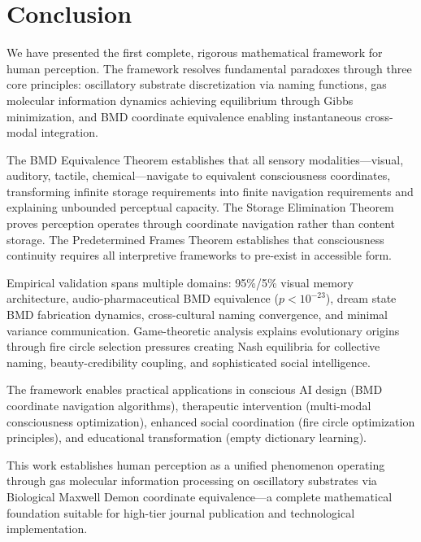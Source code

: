\documentclass[12pt]{article}
\theoremstyle{definition}
\theoremstyle{remark}
\begin{document}
\section{Conclusion}

We have presented the first complete, rigorous mathematical framework for human perception. The framework resolves fundamental paradoxes through three core principles: oscillatory substrate discretization via naming functions, gas molecular information dynamics achieving equilibrium through Gibbs minimization, and BMD coordinate equivalence enabling instantaneous cross-modal integration.

The BMD Equivalence Theorem establishes that all sensory modalities—visual, auditory, tactile, chemical—navigate to equivalent consciousness coordinates, transforming infinite storage requirements into finite navigation requirements and explaining unbounded perceptual capacity. The Storage Elimination Theorem proves perception operates through coordinate navigation rather than content storage. The Predetermined Frames Theorem establishes that consciousness continuity requires all interpretive frameworks to pre-exist in accessible form.

Empirical validation spans multiple domains: 95\%/5\% visual memory architecture, audio-pharmaceutical BMD equivalence ($p < 10^{-23}$), dream state BMD fabrication dynamics, cross-cultural naming convergence, and minimal variance communication. Game-theoretic analysis explains evolutionary origins through fire circle selection pressures creating Nash equilibria for collective naming, beauty-credibility coupling, and sophisticated social intelligence.

The framework enables practical applications in conscious AI design (BMD coordinate navigation algorithms), therapeutic intervention (multi-modal consciousness optimization), enhanced social coordination (fire circle optimization principles), and educational transformation (empty dictionary learning).

This work establishes human perception as a unified phenomenon operating through gas molecular information processing on oscillatory substrates via Biological Maxwell Demon coordinate equivalence—a complete mathematical foundation suitable for high-tier journal publication and technological implementation.
\end{document}
